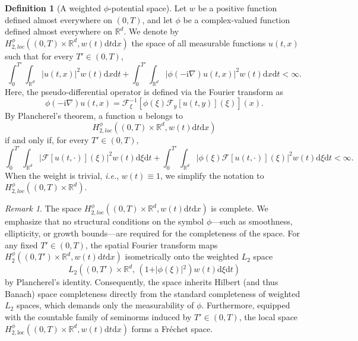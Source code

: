 \documentclass[11pt,reqno]{amsart}
\theoremstyle{definition}
\newtheorem{defn}[thm]{Definition}
\theoremstyle{remark}
\newtheorem{rem}[thm]{Remark}
\numberwithin{equation}{section}
\begin{document}
\begin{defn}[A weighted $\phi$-potential space]
										\label{phi space}
Let $w$ be a positive function defined almost everywhere on $(0,T)$, and let $\phi$ be a complex-valued function defined almost everywhere on $\mathbb{R}^d$. 
We denote by $H_{2,loc}^{\phi}\left( (0,T) \times \mathbb{R}^d, w(t)\mathrm{d}t\mathrm{d}x \right)$ the space of all measurable functions $u(t,x)$ such that for every $T' \in (0,T)$,
$$
\int_0^{T'} \int_{\mathbb{R}^d} \left|u(t,x)\right|^2 w(t) \mathrm{d}x \mathrm{d}t + \int_0^{T'} \int_{\mathbb{R}^d} \left|\phi(-\mathrm{i}\nabla)u(t,x)\right|^2 w(t) \mathrm{d}x \mathrm{d}t < \infty.
$$
Here, the pseudo-differential operator is defined via the Fourier transform as
$$
\phi(-\mathrm{i}\nabla)u(t,x) = \mathcal{F}_\xi^{-1}\left[ \phi(\xi) \mathcal{F}_y[u(t,y)](\xi) \right](x).
$$ 
By Plancherel's theorem, a function $u$ belongs to 
$$
H_{2,loc}^{\phi}\left( (0,T) \times \mathbb{R}^d, w(t)\mathrm{d}t\mathrm{d}x \right)
$$ 
if and only if, for every $T' \in (0,T)$,
$$
\int_0^{T'} \int_{\mathbb{R}^d} \left|\mathcal{F}[u(t,\cdot)](\xi)\right|^2 w(t) \mathrm{d}\xi \mathrm{d}t 
+ \int_0^{T'} \int_{\mathbb{R}^d} \left|\phi(\xi)\mathcal{F}[u(t,\cdot)](\xi)\right|^2 w(t) \mathrm{d}\xi \mathrm{d}t < \infty. 
$$
When the weight is trivial, \textit{i.e.}, $w(t) \equiv 1$, we simplify the notation to $H_{2,loc}^{\phi}\left( (0,T) \times \mathbb{R}^d \right)$.
\end{defn}


\begin{rem}
The space $H_{2,loc}^{\phi}\left( (0,T) \times \mathbb{R}^d, w(t)\mathrm{d}t\mathrm{d}x \right)$ is complete. 
We emphasize that no structural conditions on the symbol $\phi$—such as smoothness, ellipticity, or growth bounds—are required for the completeness of the space. For any fixed 
$T' \in (0,T)$, the spatial Fourier transform maps $H_{2}^{\phi}\left( (0,T') \times \mathbb{R}^d, w(t)\mathrm{d}t\mathrm{d}x \right)$ isometrically onto the weighted $L_2$ space
$$
L_2\left( (0,T') \times \mathbb{R}^d, \, \left(1 + \vert{}\phi(\xi)\vert{}^2\right)w(t)\mathrm{d}\xi\mathrm{d}t \right)
$$
by Plancherel's identity. Consequently, the space inherits Hilbert (and thus Banach) space completeness directly from the standard completeness of weighted $L_2$ spaces, which demands only the measurability of $\phi$. 
Furthermore, equipped with the countable family of seminorms induced by $T' \in (0,T)$, the local space $H_{2,\mathrm{loc}}^{\phi}\left( (0,T) \times \mathbb{R}^d, w(t)\mathrm{d}t\mathrm{d}x \right)$ forms a Fréchet space.
\end{rem}
\end{document}
